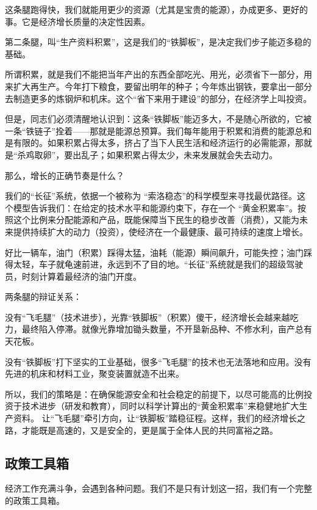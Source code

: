 这条腿跑得快，我们就能用更少的资源（尤其是宝贵的能源），办成更多、更好的事。它是经济增长质量的决定性因素。

第二条腿，叫``生产资料积累''，这是我们的``铁脚板''，是决定我们步子能迈多稳的基础。

所谓积累，就是我们不能把当年产出的东西全部吃光、用光，必须省下一部分，用来扩大再生产。今年打下粮食，要留出明年的种子；今年炼出钢铁，要拿出一部分去制造更多的炼钢炉和机床。这个``省下来用于建设''的部分，在经济学上叫投资。

但是，同志们必须清醒地认识到：这条``铁脚板''能迈多大，不是随心所欲的，它被一条``铁链子''拴着------那就是能源总预算。我们每年能用于积累和消费的能源总和是有限的。如果积累占得太多，挤占了当下人民生活和经济运行的必需能源，那就是``杀鸡取卵''，要出乱子；如果积累占得太少，未来发展就会失去动力。

那么，增长的正确节奏是什么？

我们的``长征''系统，依据一个被称为 ``索洛稳态''的科学模型来寻找最优路径。这个模型告诉我们：在给定的技术水平和能源约束下，存在一个 ``黄金积累率''。按照这个比例来分配能源和产品，既能保障当下民生的稳步改善（消费），又能为未来提供持续扩大的动力（投资），使经济在一个最健康、最可持续的速度上增长。

好比一辆车，油门（积累）踩得太猛，油耗（能源）瞬间飙升，可能失控；油门踩得太轻，车子就龟速前进，永远到不了目的地。``长征''系统就是我们的超级驾驶员，时刻计算着最经济的油门开度。

两条腿的辩证关系：

没有``飞毛腿''（技术进步），光靠``铁脚板''（积累）傻干，经济增长会越来越吃力，最终陷入停滞。就像光靠增加锄头数量，不开垦新品种、不修水利，亩产总有天花板。

没有``铁脚板''打下坚实的工业基础，很多``飞毛腿''的技术也无法落地和应用。没有先进的机床和材料工业，聚变装置就造不出来。

所以，我们的策略是：在确保能源安全和社会稳定的前提下，以尽可能高的比例投资于技术进步（研发和教育），同时以科学计算出的``黄金积累率''来稳健地扩大生产资料。 让``飞毛腿''牵引方向，让``铁脚板''踏稳征程。这样，我们的经济增长之路，才能既是高速的，又是安全的，更是属于全体人民的共同富裕之路。

\subsection{政策工具箱}\label{ux653fux7b56ux5de5ux5177ux7bb1}

经济工作充满斗争，会遇到各种问题。我们不是只有计划这一招，我们有一个完整的政策工具箱。

